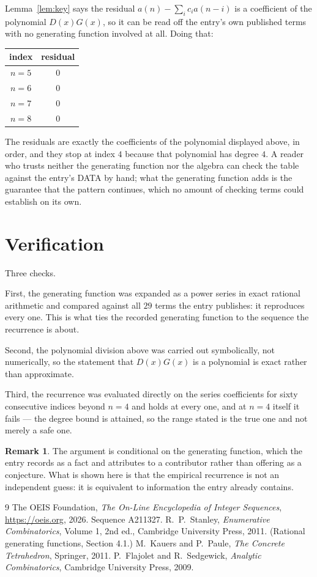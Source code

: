 \documentclass[11pt,a4paper]{article}
\theoremstyle{plain}
\theoremstyle{definition}
\newtheorem{remark}[theorem]{Remark}
\begin{document}
Lemma~\ref{lem:key} says the residual $a(n)-\sum_ic_ia(n-i)$ is a coefficient of the
polynomial $D(x)G(x)$, so it can be read off the entry's own published terms with no
generating function involved at all. Doing that:
\begin{center}
\begin{tabular}{cc}
index & residual \\ \hline
$n=5$ & $0$ \\
$n=6$ & $0$ \\
$n=7$ & $0$ \\
$n=8$ & $0$
\end{tabular}
\end{center}
The residuals are exactly the coefficients of the polynomial displayed above, in order, and
they stop at index $4$ because that polynomial has degree $4$. A reader who trusts
neither the generating function nor the algebra can check the table against the entry's DATA
by hand; what the generating function adds is the guarantee that the pattern continues, which
no amount of checking terms could establish on its own.

\section{Verification}

Three checks.

First, the generating function was expanded as a power series in exact rational arithmetic and
compared against all $29$ terms the entry publishes: it reproduces every one. This is
what ties the recorded generating function to the sequence the recurrence is about.

Second, the polynomial division above was carried out symbolically, not numerically, so the
statement that $D(x)G(x)$ is a polynomial is exact rather than approximate.

Third, the recurrence was evaluated directly on the series coefficients for sixty consecutive
indices beyond $n=4$ and holds at every one, and at $n=4$ itself it fails --- the
degree bound is attained, so the range stated is the true one and not merely a safe one.

\begin{remark}
The argument is conditional on the generating function, which the entry records as a fact and
attributes to a contributor rather than offering as a conjecture. What is shown here is that
the empirical recurrence is not an independent guess: it is equivalent to information the
entry already contains.
\end{remark}

\begin{thebibliography}{9}
 The OEIS Foundation, \emph{The On-Line Encyclopedia of Integer
Sequences}, \url{https://oeis.org}, 2026. Sequence A211327.
 R.~P.~Stanley, \emph{Enumerative Combinatorics}, Volume 1, 2nd ed.,
Cambridge University Press, 2011. (Rational generating functions, Section 4.1.)
 M.~Kauers and P.~Paule, \emph{The Concrete Tetrahedron}, Springer, 2011.
 P.~Flajolet and R.~Sedgewick, \emph{Analytic Combinatorics}, Cambridge
University Press, 2009.
\end{thebibliography}
\end{document}
